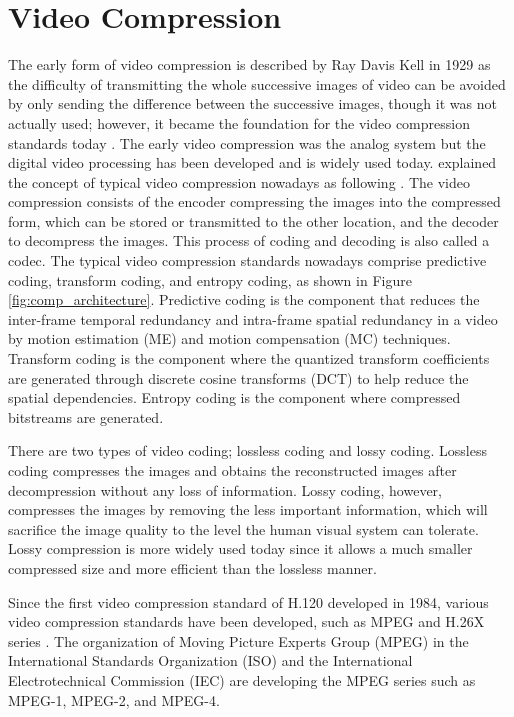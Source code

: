 \section{Video Compression}
\label{sec:introduction/section_b}

The early form of video compression is described by Ray Davis Kell in 1929 as the difficulty of transmitting the whole successive images of video can be avoided by only sending the difference between the successive images, though it was not actually used; however, it became the foundation for the video compression standards today \cite{jacobs_brief_2009}. The early video compression was the analog system but the digital video processing has been developed and is widely used today. \citeauthor{zhang_overview_2019} explained the concept of typical video compression nowadays as following \cite{zhang_overview_2019}. The video compression consists of the encoder compressing the images into the compressed form, which can be stored or transmitted to the other location, and the decoder to decompress the images. This process of coding and decoding is also called a codec. The typical video compression standards nowadays comprise predictive coding, transform coding, and entropy coding, as shown in Figure \ref{fig:comp_architecture}. Predictive coding is the component that reduces the inter-frame temporal redundancy and intra-frame spatial redundancy in a video by motion estimation (ME) and motion compensation (MC) techniques. Transform coding is the component where the quantized transform coefficients are generated through discrete cosine transforms (DCT) to help reduce the spatial dependencies. Entropy coding is the component where compressed bitstreams are generated.



There are two types of video coding; lossless coding and lossy coding. Lossless coding compresses the images and obtains the reconstructed images after decompression without any loss of information. Lossy coding, however, compresses the images by removing the less important information, which will sacrifice the image quality to the level the human visual system can tolerate. Lossy compression is more widely used today since it allows a much smaller compressed size and more efficient than the lossless manner.

Since the first video compression standard of H.120 developed in 1984, various video compression standards have been developed, such as MPEG and H.26X series \cite{zhang_overview_2019}. The organization of Moving Picture Experts Group (MPEG) in the International Standards Organization (ISO) and the International Electrotechnical Commission (IEC) are developing the MPEG series such as MPEG-1, MPEG-2, and MPEG-4.


